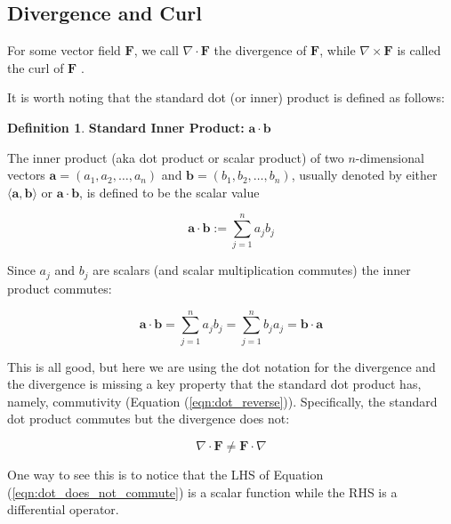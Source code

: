 \documentclass{article}
\theoremstyle{definition}
\newtheorem{definition}{Definition}[section]
\begin{document}
\subsection{Divergence and Curl}
\label{subsec:divergence_and_curl}
For some vector field $\mathbf{F}$, we call $\nabla \cdot
\mathbf{F}$ the divergence of $\mathbf{F}$, while $\nabla \times
\mathbf{F}$ is called the curl of $\mathbf{F}$
\cite{dmm:vector_calculus}. 

\bigskip
\noindent
It is worth noting that the standard
dot (or inner) product is defined as follows:


\medskip
\begin{definition}
{\bf Standard Inner Product:} $\mathbf{a} \cdot \mathbf{b}$

\bigskip
\noindent
The inner product (aka dot product 
or scalar product) of two $n$-dimensional vectors 
$\mathbf{a} = (a_1,a_2,\hdots, a_n)$ and 
$\mathbf{b} = (b_1,b_2,\hdots, b_n)$, usually 
denoted by either $\langle \mathbf{a}, \mathbf{b} 
\rangle$ or $\mathbf{a} \cdot \mathbf{b}$,
is defined to be the scalar value

\medskip
\begin{equation*}
\mathbf{a} \cdot \mathbf{b} := 
	\sum\limits_{j = 1}^{n} a_j b_j
\label{eqn:inner}
\end{equation*}
\end{definition}

\smallskip
\noindent
Since $a_j$ and $b_j$ are scalars (and scalar multiplication
commutes) the inner product commutes:

\bigskip
\begin{equation}
  \mathbf{a} \cdot \mathbf{b}
  = \sum\limits_{j = 1}^{n} a_j b_j
  = \sum\limits_{j = 1}^{n} b_j a_j
  = \mathbf{b} \cdot \mathbf{a} 
\label{eqn:dot_reverse}
\end{equation}


\bigskip
\noindent
This is all good, but here we are using the dot notation for the
divergence and the divergence is missing a key property that the
standard dot product has, namely, commutivity (Equation
(\ref{eqn:dot_reverse})). Specifically, the standard dot product
commutes but the divergence does not:

\medskip
\begin{equation}
\nabla \cdot \mathbf{F} \neq \mathbf{F} \cdot \nabla
\label{eqn:dot_does_not_commute}
\end{equation}

\bigskip
\noindent
One way to see this is to notice that the LHS of Equation
(\ref{eqn:dot_does_not_commute}) is a scalar function while the
RHS is a differential operator.
\end{document}
